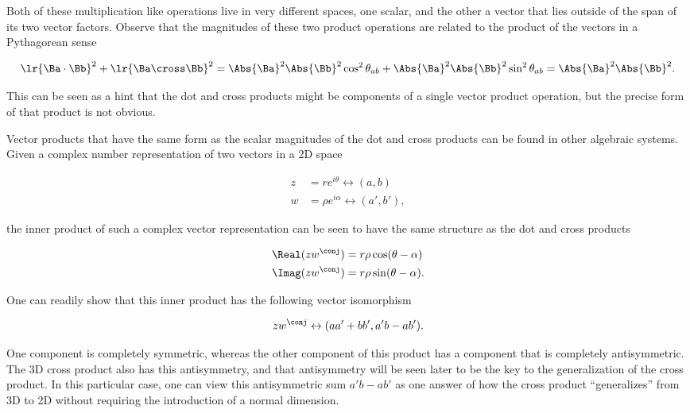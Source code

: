 Both of these multiplication like operations live in very different spaces, one scalar, and the other a vector that lies outside of the span of its two vector factors.  Observe that the magnitudes of these two product operations are related to the product of the vectors in a Pythagorean sense

\begin{dmath}\label{eqn:GAmotivation:180}
\lr{ \Ba \cdot \Bb }^2 + \lr{ \Ba \cross \Bb }^2 
=
\Abs{\Ba}^2 \Abs{\Bb}^2 \cos^2 \theta_{ab} 
+\Abs{\Ba}^2 \Abs{\Bb}^2 \sin^2 \theta_{ab} 
= 
\Abs{\Ba}^2 \Abs{\Bb}^2.
\end{dmath}

This can be seen as a hint that the dot and cross products might be components of a single vector product operation, but the precise form of that product is not obvious.

Vector products that have the same form as the scalar magnitudes of the dot and cross products can be found in other algebraic systems.  Given a complex number representation of two vectors in a 2D space

\begin{dmath}\label{eqn:GAmotivation:200}
\begin{aligned}
z &= r e^{i \theta} \leftrightarrow (a, b) \\
w &= \rho e^{i \alpha} \leftrightarrow (a', b'),
\end{aligned}
\end{dmath}

the inner product of such a complex vector representation can be seen to have the same structure as the dot and cross products

\begin{equation}\label{eqn:GAmotivation:100}
\begin{aligned}
\Real( z w^\conj ) &= r \rho \cos(\theta - \alpha) \\
\Imag( z w^\conj ) &= r \rho \sin(\theta - \alpha).
\end{aligned}
\end{equation}

One can readily show that this inner product has the following vector isomorphism

\begin{dmath}\label{eqn:GAmotivation:220}
z w^\conj \leftrightarrow ( a a' + b b', a' b - a b' ).
\end{dmath}

One component is completely symmetric, whereas the other component of this product has a component that is completely antisymmetric.  
The 3D cross product also has this antisymmetry, and that antisymmetry will be seen later to be the key to the generalization of the cross product.  In this particular case, one can view this antisymmetric sum \( a' b - a b' \) as one 
answer of how the cross product ``generalizes'' from 3D to 2D without requiring the introduction of a normal dimension.


